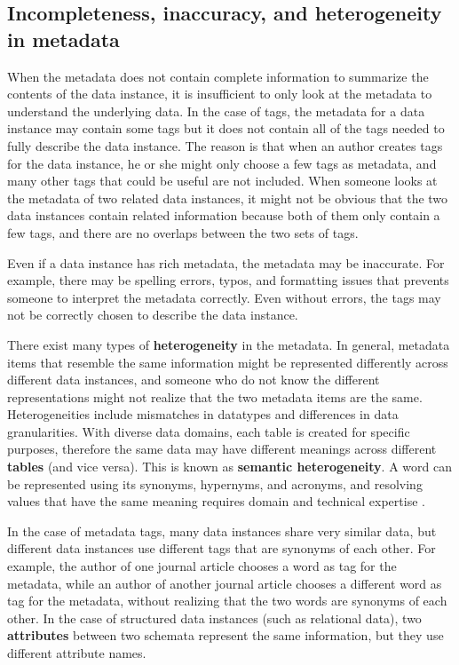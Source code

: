 \subsection{Incompleteness, inaccuracy, and heterogeneity in metadata}

When the metadata does not contain complete information to summarize the contents of the data instance, it is insufficient to only look at the metadata to understand the underlying data. In the case of tags, the metadata for a data instance may contain some tags but it does not contain all of the tags needed to fully describe the data instance. The reason is that when an author creates tags for the data instance, he or she might only choose a few tags as metadata, and many other tags that could be useful are not included. When someone looks at the metadata of two related data instances, it might not be obvious that the two data instances contain related information because both of them only contain a few tags, and there are no overlaps between the two sets of tags.

Even if a data instance has rich metadata, the metadata may be inaccurate. For example, there may be spelling errors, typos, and formatting issues that prevents someone to interpret the metadata correctly. Even without errors, the tags may not be correctly chosen to describe the data instance.

There exist many types of \textbf{\gls{heterogeneity}} in the metadata. In general, metadata items that resemble the same information might be represented differently across different data instances, and someone who do not know the different representations might not realize that the two metadata items are the same. Heterogeneities include mismatches in datatypes and differences in data granularities. With diverse data domains, each table is created for specific purposes, therefore the same data may have different meanings across different \textbf{\glspl{table}} (and vice versa). This is known as \textbf{\gls{semantic heterogeneity}}. A word can be represented using its synonyms, hypernyms, and acronyms, and resolving values that have the same meaning requires domain and technical expertise \cite{Halevy2005Why}.

In the case of metadata tags, many data instances share very similar data, but different data instances use different tags that are synonyms of each other. For example, the author of one journal article chooses a word as tag for the metadata, while an author of another journal article chooses a different word as tag for the metadata, without realizing that the two words are synonyms of each other. In the case of structured data instances (such as relational data), two \textbf{\glspl{attribute}} between two schemata represent the same information, but they use different attribute names.

